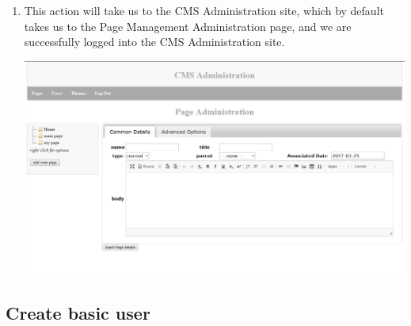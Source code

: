 \documentclass[12pt]{article}
\begin{document}
\begin{enumerate}
  \item This action will take us to the CMS Administration site, which by default takes us to the Page Management Administration page, and we are successfully logged into the CMS Administration site.
  
  \includegraphics[width=\textwidth,height=\textheight,keepaspectratio]{pics/pageAdmin.png}

\end{enumerate}

\subsection{Create basic user}
\end{document}
